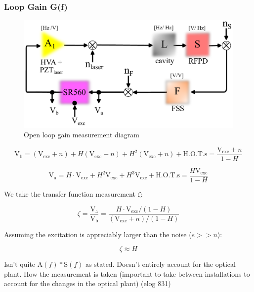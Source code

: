 \subsubsection{Loop Gain G(f)}
\begin{figure}[H]
  \begin{center}
    \includegraphics[width=\textwidth]{figs/ALGAAS/olg_meas_diagram.pdf}
    \caption{Open loop gain measurement diagram}
  \end{center}
  \label{fig:OLGmath}
\end{figure}

\begin{equation}
    \mathrm{V}_\mathrm{b} = (\mathrm{V}_\mathrm{exc}+n) + H(\mathrm{V}_\mathrm{exc}+n) + H^2 (\mathrm{V}_\mathrm{exc}+n) + \mathrm{H.O.T.s} = \frac{\mathrm{V}_\mathrm{exc} + n}{1-H}
\end{equation}

\begin{equation}
    \mathrm{V}_\mathrm{a} = H\cdot \mathrm{V}_\mathrm{exc} + H^2\mathrm{V}_\mathrm{exc} + H^3\mathrm{V}_\mathrm{exc} + \mathrm{H.O.T.s}  = \frac{H\mathrm{V}_\mathrm{exc}}{1-H}
\end{equation}

We take the transfer function measurement $\zeta$:

\begin{equation}
    \zeta = \frac{\mathrm{V}_\mathrm{a}}{\mathrm{V}_\mathrm{b}} = \frac{H \cdot \mathrm{V}_\mathrm{exc}/(1-H)}{(\mathrm{V}_\mathrm{exc}+n)/(1-H)}
\end{equation}

Assuming the excitation is appreciably larger than the noise ($e>>n$):

\begin{equation}
\zeta \approx H
\end{equation}

Isn't quite $\mathrm{A}(f)*\mathrm{S}(f)$ as stated. Doesn't entirely account for the optical plant.
How the measurement is taken (important to take between installations to account for the changes in the optical plant) (elog 831)

